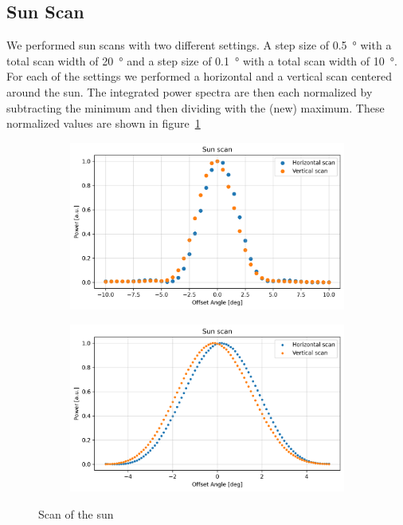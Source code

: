 \subsection{Sun Scan}
We performed sun scans with two different settings.
A step size of \SI{0.5}{\degree} with a total scan width of \SI{20}{\degree} and a step size of \SI{0.1}{\degree} with a total scan width of \SI{10}{\degree}.
For each of the settings we performed a horizontal and a vertical scan centered around the sun.
The integrated power spectra are then each normalized by subtracting the minimum and then dividing with the (new) maximum.
These normalized values are shown in figure~\ref{fig:sun_scan}

\begin{figure}[H]
    \centering
    \begin{subfigure}[t]{0.45\linewidth}
        \includegraphics[width=\linewidth]{assets/sun_scan_low_res.png}
    \end{subfigure}
    \begin{subfigure}[t]{0.45\linewidth}
        \includegraphics[width=\linewidth]{assets/sun_scan_high_res.png}
    \end{subfigure}
    \caption{Scan of the sun}
    \label{fig:sun_scan}
\end{figure}

